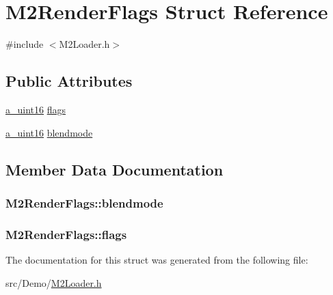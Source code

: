 \hypertarget{struct_m2_render_flags}{\section{M2\+Render\+Flags Struct Reference}
\label{struct_m2_render_flags}
}


{\ttfamily \#include $<$M2\+Loader.\+h$>$}

\subsection*{Public Attributes}
\begin{DoxyCompactItemize}
\item 
\hyperlink{_common_defines_8h_a7e7afab9b2de210021aed9953c6b367f}{a\+\_\+uint16} \hyperlink{struct_m2_render_flags_af7d3231b054ac4ae688f6525f0b8fc52}{flags}
\item 
\hyperlink{_common_defines_8h_a7e7afab9b2de210021aed9953c6b367f}{a\+\_\+uint16} \hyperlink{struct_m2_render_flags_aaa9c7294f84000353810d925f301ec9c}{blendmode}
\end{DoxyCompactItemize}


\subsection{Member Data Documentation}
\hypertarget{struct_m2_render_flags_aaa9c7294f84000353810d925f301ec9c}{
\subsubsection[{blendmode}]{ M2\+Render\+Flags\+::blendmode}}\label{struct_m2_render_flags_aaa9c7294f84000353810d925f301ec9c}
\hypertarget{struct_m2_render_flags_af7d3231b054ac4ae688f6525f0b8fc52}{
\subsubsection[{flags}]{ M2\+Render\+Flags\+::flags}}\label{struct_m2_render_flags_af7d3231b054ac4ae688f6525f0b8fc52}


The documentation for this struct was generated from the following file\+:\begin{DoxyCompactItemize}
\item 
src/\+Demo/\hyperlink{_m2_loader_8h}{M2\+Loader.\+h}\end{DoxyCompactItemize}
